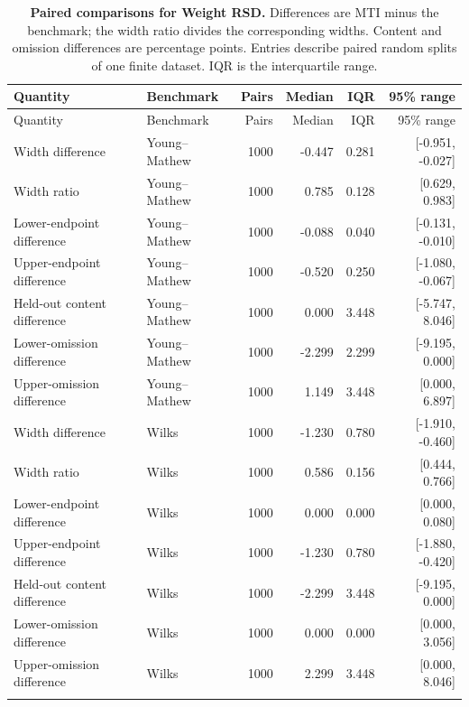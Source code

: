 \begingroup
\footnotesize
\setlength{\tabcolsep}{3pt}
\begin{longtable}{@{}llrrrr@{}}
\caption{\textbf{Paired comparisons for Weight RSD.} Differences are MTI minus the benchmark; the width ratio divides the corresponding widths. Content and omission differences are percentage points. Entries describe paired random splits of one finite dataset. IQR is the interquartile range.}\label{rqr2026:tab:supp-pharma-rsd-paired}\\
\toprule
Quantity & Benchmark & Pairs & Median & IQR & 95\% range\\
\midrule
\endfirsthead
\toprule
Quantity & Benchmark & Pairs & Median & IQR & 95\% range\\
\midrule
\endhead
Width difference & Young--Mathew & 1000 & -0.447 & 0.281 & [-0.951, -0.027] \\
Width ratio & Young--Mathew & 1000 & 0.785 & 0.128 & [0.629, 0.983] \\
Lower-endpoint difference & Young--Mathew & 1000 & -0.088 & 0.040 & [-0.131, -0.010] \\
Upper-endpoint difference & Young--Mathew & 1000 & -0.520 & 0.250 & [-1.080, -0.067] \\
Held-out content difference & Young--Mathew & 1000 & 0.000 & 3.448 & [-5.747, 8.046] \\
Lower-omission difference & Young--Mathew & 1000 & -2.299 & 2.299 & [-9.195, 0.000] \\
Upper-omission difference & Young--Mathew & 1000 & 1.149 & 3.448 & [0.000, 6.897] \\
\addlinespace
Width difference & Wilks & 1000 & -1.230 & 0.780 & [-1.910, -0.460] \\
Width ratio & Wilks & 1000 & 0.586 & 0.156 & [0.444, 0.766] \\
Lower-endpoint difference & Wilks & 1000 & 0.000 & 0.000 & [0.000, 0.080] \\
Upper-endpoint difference & Wilks & 1000 & -1.230 & 0.780 & [-1.880, -0.420] \\
Held-out content difference & Wilks & 1000 & -2.299 & 3.448 & [-9.195, 0.000] \\
Lower-omission difference & Wilks & 1000 & 0.000 & 0.000 & [0.000, 3.056] \\
Upper-omission difference & Wilks & 1000 & 2.299 & 3.448 & [0.000, 8.046] \\
\addlinespace
\bottomrule
\end{longtable}
\endgroup
